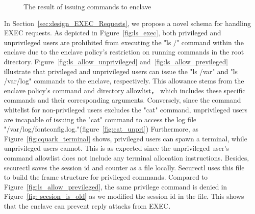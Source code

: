 \begin{figure}[!htb]

    
    \caption[The result of issuing  commands to enclave]{The result of issuing  commands to enclave\label{fig:exec}}
\end{figure}


In Section~\ref*{sec:design_EXEC_Requests}, we propose a novel schema for handling EXEC requests. As depicted in Figure~\ref{fig:ls_exec}, both privileged and unprivileged users are prohibited from executing the "ls /" command within the enclave due to the enclave policy's restriction on running commands in the root directory. 
Figure~\ref{fig:ls_allow_unprivileged} and~\ref{fig:ls_allow_previleged} illustrate that privileged and unprivileged users can issue the "ls /var" and "ls /var/log" commands to the enclave, respectively. This allowance stems from the enclave policy's command and directory allowlist， which 
includes these specific commands and their corresponding arguments. Conversely, since the command whitelist for non-privileged users excludes the "cat" command, unprivileged users are incapable of issuing the "cat" command to access the log file "/var/log/fontconfig.log."(figure~\ref{fig:cat_unpri}) 
Furthermore, as Figure~\ref{fig:cquark_terminal} shows, privileged users can spawn a terminal, while unprivileged users cannot. 
This is as expected since the unprivileged user's command allowlist does not include any terminal allocation instructions. 
Besides, securectl saves the session id and counter as a file locally. Securectl uses this file to build the frame structure for privileged commands. Compared to Figure~\ref{fig:ls_allow_previleged}, the same privilege command is denied in Figure~\ref{fig: seesion_is_old} as we modified the session 
id in the file. This shows that the enclave can prevent reply attacks from EXEC.


